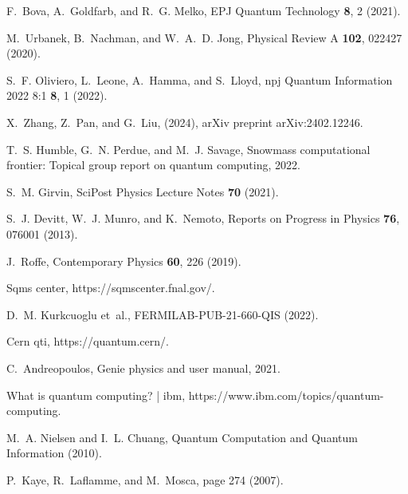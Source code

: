 
% 
\begin{thebibliography}{10}

    F.~Bova, A.~Goldfarb, and R.~G. Melko,
    \newblock EPJ Quantum Technology {\bf 8}, 2 (2021).
    
    M.~Urbanek, B.~Nachman, and W.~A.~D. Jong,
    \newblock Physical Review A {\bf 102}, 022427 (2020).
    
    S.~F. Oliviero, L.~Leone, A.~Hamma, and S.~Lloyd,
    \newblock npj Quantum Information 2022 8:1 {\bf 8}, 1 (2022).
    
    X.~Zhang, Z.~Pan, and G.~Liu,
    \newblock (2024),
    \newblock arXiv preprint arXiv:2402.12246.
    
    T.~S. Humble, G.~N. Perdue, and M.~J. Savage,
    \newblock Snowmass computational frontier: Topical group report on quantum
      computing, 2022.
    
    S.~M. Girvin,
    \newblock SciPost Physics Lecture Notes {\bf 70} (2021).
    
    S.~J. Devitt, W.~J. Munro, and K.~Nemoto,
    \newblock Reports on Progress in Physics {\bf 76}, 076001 (2013).
    
    J.~Roffe,
    \newblock Contemporary Physics {\bf 60}, 226 (2019).
    
    Sqms center,
    \newblock https://sqmscenter.fnal.gov/.
    
    D.~M. Kurkcuoglu et~al.,
    \newblock FERMILAB-PUB-21-660-QIS  (2022).
    
    Cern qti,
    \newblock https://quantum.cern/.
    
    C.~Andreopoulos,
    \newblock Genie physics and user manual, 2021.
    
    What is quantum computing? | ibm,
    \newblock https://www.ibm.com/topics/quantum-computing.
    
    M.~A. Nielsen and I.~L. Chuang,
    \newblock Quantum Computation and Quantum Information  (2010).
    
    P.~Kaye, R.~Laflamme, and M.~Mosca,
    \newblock page 274 (2007).
    

\end{thebibliography}
